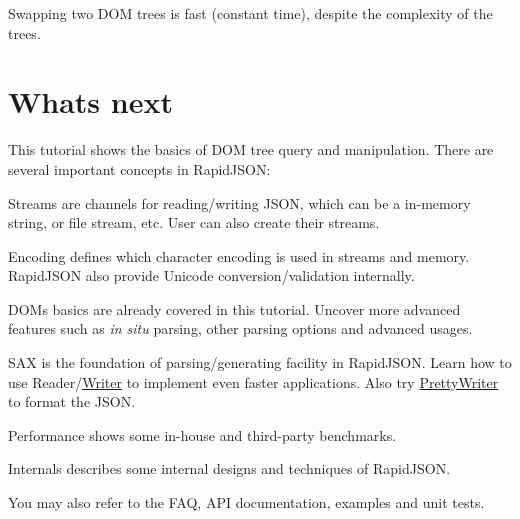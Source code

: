 Swapping two D\+OM trees is fast (constant time), despite the complexity of the trees.\hypertarget{md_Commun_Externe_RapidJSON_doc_tutorial.zh-cn_WhatsNext}{}\section{What\textquotesingle{}s next}\label{md_Commun_Externe_RapidJSON_doc_tutorial.zh-cn_WhatsNext}
This tutorial shows the basics of D\+OM tree query and manipulation. There are several important concepts in Rapid\+J\+S\+ON\+:


\begin{DoxyEnumerate}
\item Streams are channels for reading/writing J\+S\+ON, which can be a in-\/memory string, or file stream, etc. User can also create their streams.
\item Encoding defines which character encoding is used in streams and memory. Rapid\+J\+S\+ON also provide Unicode conversion/validation internally.
\item D\+OM\textquotesingle{}s basics are already covered in this tutorial. Uncover more advanced features such as {\itshape in situ} parsing, other parsing options and advanced usages.
\item S\+AX is the foundation of parsing/generating facility in Rapid\+J\+S\+ON. Learn how to use {\ttfamily Reader}/{\ttfamily \hyperlink{class_writer}{Writer}} to implement even faster applications. Also try {\ttfamily \hyperlink{class_pretty_writer}{Pretty\+Writer}} to format the J\+S\+ON.
\item Performance shows some in-\/house and third-\/party benchmarks.
\item Internals describes some internal designs and techniques of Rapid\+J\+S\+ON.
\end{DoxyEnumerate}

You may also refer to the F\+AQ, A\+PI documentation, examples and unit tests. 